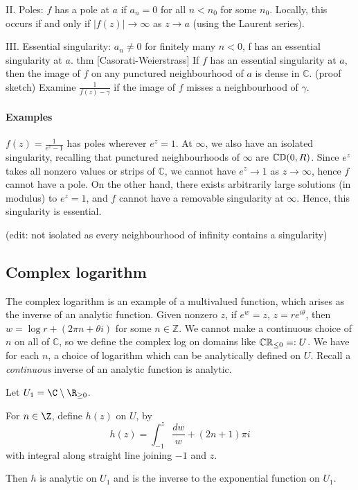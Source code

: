 \documentclass{article}
\begin{document}
II. Poles: $f$ has a pole at $a$ if $a_n = 0$ for all $n < n_0$ for some $n_0$. Locally, this occurs if and only if $|f(z)| \to \infty$ as $z \to a$ (using the Laurent series).

III. Essential singularity: $a_n \neq 0$ for finitely many $n < 0$, f has an essential singularity at $a$.
thm [Casorati-Weierstrass] If $f$ has an essential singularity at $a$, then the image of $f$ on any punctured neighbourhood of $a$ is dense in $\mathbb{C}$.
(proof sketch) Examine $\frac1{f(z) - \gamma}$ if the image of $f$ misses a neighbourhood of $\gamma$.

\paragraph{Examples}
$f(z) = \frac1{e^z - 1}$ has poles wherever $e^z = 1$.
At $\infty$, we also have an isolated singularity, recalling that punctured neighbourhoods of $\infty$ are $\mathbb{C}\\ \mathbb{D}(0, R)$. Since $e^z$ takes all nonzero values or strips of $\mathbb{C}$, we cannot have $e^z \to 1$ as $z \to \infty$, hence $f$ cannot have a pole.  On the other hand, there exists arbitrarily large solutions (in modulus) to $e^z = 1$, and $f$ cannot have a removable singularity at $\infty$.  Hence, this singularity is essential.

(edit: not isolated as every neighbourhood of infinity contains a singularity)

\subsection{Complex logarithm}
The complex logarithm is an example of a multivalued function, which arises as the inverse of an analytic function. Given nonzero $z$, if $e^w = z$, $z = r e^{i \theta}$, then $w = \log r + (2 \pi n + \theta i)$ for some $n \in \mathbb{Z}$.  We cannot make a continuous choice of $n$ on all of $\mathbb{C}$, so we define the complex log on domains like $\mathbb{C} \\ \mathbb{R}_{\leq 0} =: U$. We have for each $n$, a choice of logarithm which can be analytically defined on $U$.  Recall a \emph{continuous} inverse of an analytic function is analytic.


Let $U_1 = \C \setminus \R_{\geq 0}$.

\begin{prop}
    For $n \in \Z$, define $h(z)$ on $U$, by
    \begin{equation*}
        h(z) = \int_{-1}^z \frac{dw}{w} + (2n+1) \pi i
    \end{equation*}
    with integral along straight line joining $-1$ and $z$.

    Then $h$ is analytic on $U_1$ and is the inverse to the exponential function on $U_1$.
\end{prop}
\end{document}
